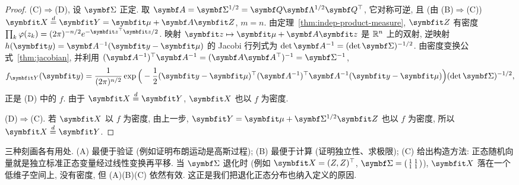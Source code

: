 \begin{proof}
(C)$\Rightarrow$(D), 设 $\mat{\Sigma}$ 正定. 取 $\mat{A}=\mat{\Sigma}^{1/2}=\mat{Q}\mat{\Lambda}^{1/2}\mat{Q}^\T$, 它对称可逆, 且 (由 (B)$\Rightarrow$(C)) $\rvec{X}\overset{d}{=}\rvec{Y}=\rvec{\mu}+\mat{A}\rvec{Z}$, $m=n$. 由定理~\ref{thm:indep-product-measure}, $\rvec{Z}$ 有密度 $\prod_k\varphi(z_k)=(2\pi)^{-n/2}e^{-\rvec{z}^\T\rvec{z}/2}$. 映射 $\rvec{z}\mapsto\rvec{\mu}+\mat{A}\rvec{z}$ 是 $\mathbb{R}^n$ 上的双射, 逆映射 $h(\rvec{y})=\mat{A}^{-1}(\rvec{y}-\rvec{\mu})$ 的 Jacobi 行列式为 $\det\mat{A}^{-1}=(\det\mat{\Sigma})^{-1/2}$. 由密度变换公式~\ref{thm:jacobian}, 并利用 $(\mat{A}^{-1})^\T\mat{A}^{-1}=(\mat{A}\mat{A}^\T)^{-1}=\mat{\Sigma}^{-1}$,
\[
f_{\rvec{Y}}(\rvec{y})=\frac{1}{(2\pi)^{n/2}}\exp\Big(-\frac{1}{2}(\rvec{y}-\rvec{\mu})^\T(\mat{A}^{-1})^\T\mat{A}^{-1}(\rvec{y}-\rvec{\mu})\Big)(\det\mat{\Sigma})^{-1/2},
\]
正是 (D) 中的 $f$. 由于 $\rvec{X}\overset{d}{=}\rvec{Y}$, $\rvec{X}$ 也以 $f$ 为密度.

(D)$\Rightarrow$(C). 若 $\rvec{X}$ 以 $f$ 为密度, 由上一步, $\rvec{Y}=\rvec{\mu}+\mat{\Sigma}^{1/2}\rvec{Z}$ 也以 $f$ 为密度, 所以 $\rvec{X}\overset{d}{=}\rvec{Y}$.
\end{proof}

\begin{intuition}
三种刻画各有用处. (A) 最便于验证 (例如证明布朗运动是高斯过程); (B) 最便于计算 (证明独立性、求极限); (C) 给出构造方法: 正态随机向量就是独立标准正态变量经过线性变换再平移. 当 $\mat{\Sigma}$ 退化时 (例如 $\rvec{X}=(Z,Z)^\T$, $\mat{\Sigma}=\begin{psmallmatrix}1&1\\1&1\end{psmallmatrix}$), $\rvec{X}$ 落在一个低维子空间上, 没有密度, 但 (A)(B)(C) 依然有效. 这正是我们把退化正态分布也纳入定义的原因.
\end{intuition}

